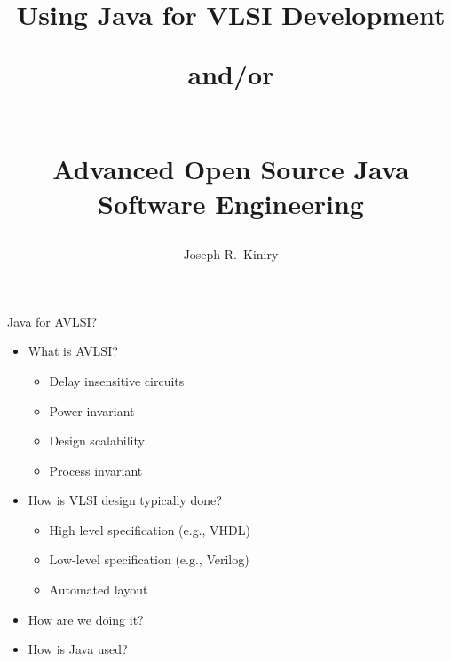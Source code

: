 \documentclass[%
final,
slideColor,
nototal,
nocolorBG,
pdf,
accumulate,
next,
]{prosper}
\title{Using Java for VLSI Development\\
\begin{small}and/or\end{small}\\
Advanced Open Source Java Software Engineering}
\author{Joseph R.~Kiniry}
\begin{document}
\maketitle








\begin{slide}{Java for AVLSI?}
  \begin{itemize}
  \item What is AVLSI?
    \begin{itemize}
    \item Delay insensitive circuits
    \item Power invariant
    \item Design scalability
    \item Process invariant
    \end{itemize}
  \item How is VLSI design typically done?
    \begin{itemize}
    \item High level specification (e.g., VHDL)
    \item Low-level specification (e.g., Verilog)
    \item Automated layout
    \end{itemize}
  \item How are we doing it?
  \item How is Java used?
  \end{itemize}
\end{slide}
\end{document}
